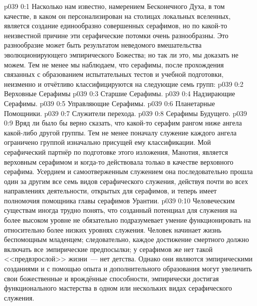 \author{Мелхиседек}
\vs p039 0:1 Насколько нам известно, намерением Бесконечного Духа, в том качестве, в каком он персонализирован на столицах локальных вселенных, является создание единообразно совершенных серафимов, но по какой\hyp{}то неизвестной причине эти серафические потомки очень разнообразны. Это разнообразие может быть результатом неведомого вмешательства эволюционирующего эмпирического Божества; но так ли это, мы доказать не можем. Тем не менее мы наблюдаем, что серафимы, после прохождения связанных с образованием испытательных тестов и учебной подготовки, неизменно и отчётливо классифицируются на следующие семь групп:
\vs p039 0:2 Верховные Серафимы
\vs p039 0:3 Старшие Серафимы.
\vs p039 0:4 Надзирающие Серафимы.
\vs p039 0:5 Управляющие Серафимы.
\vs p039 0:6 Планетарные Помощники.
\vs p039 0:7 Служители перехода.
\vs p039 0:8 Серафимы Будущего.
\vs p039 0:9 \pc Вряд ли было бы верно сказать, что какой\hyp{}то серафим рангом ниже ангела какой\hyp{}либо другой группы. Тем не менее поначалу служение каждого ангела ограничено группой изначально присущей ему классификации. Мой серафический партнёр по подготовке этого изложения, Манотия, является верховным серафимом и когда\hyp{}то действовала только в качестве верховного серафима. Усердием и самоотверженным служением она последовательно прошла один за другим все семь видов серафического служения, действуя почти во всех направлениях деятельности, открытых для серафимов, и теперь имеет полномочия помощника главы серафимов Урантии.
\vs p039 0:10 Человеческим существам иногда трудно понять, что созданный потенциал для служения на более высоком уровне не обязательно подразумевает умение функционировать на относительно более низких уровнях служения. Человек начинает жизнь беспомощным младенцем; следовательно, каждое достижение смертного должно включать все эмпирические предпосылки; у серафимов же нет такой <<предвзрослой>> жизни~--- нет детства. Однако они являются эмпирическими созданиями и с помощью опыта и дополнительного образования могут увеличить свои божественные и врождённые способности, эмпирически достигая функционального мастерства в одном или нескольких видах серафического служения.
